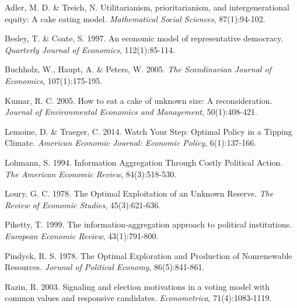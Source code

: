 \documentclass[11pt,preprint, authoryear]{elsarticle}
\numberwithin{equation}{section}
\numberwithin{figure}{section}
\numberwithin{table}{section}
\begin{document}
Adler, M. D. \& Treich, N. Utilitarianism, prioritarianism, and
intergenerational equity: A cake eating model. \emph{Mathematical Social
Sciences}, 87(1):94-102.

Besley, T. \& Coate, S. 1997. An economic model of representative
democracy. \emph{Quarterly Journal of Economics}, 112(1):85-114.

Buchholz, W., Haupt, A. \& Peters, W. 2005. \emph{The Scandinavian
Journal of Economics}, 107(1):175-195.

Kumar, R. C. 2005. How to eat a cake of unknown size: A reconsideration.
\emph{Journal of Environmental Economics and Management}, 50(1):408-421.

Lemoine, D. \& Traeger, C. 2014. Watch Your Step: Optimal Policy in a
Tipping Climate. \emph{American Economic Journal: Economic Policy},
6(1):137-166.

Lohmann, S. 1994. Information Aggregation Through Costly Political
Action. \emph{The American Economic Review}, 84(3):518-530.

Loury, G. C. 1978. The Optimal Exploitation of an Unknown Reserve.
\emph{The Review of Economic Studies}, 45(3):621-636.

Piketty, T. 1999. The information-aggregation approach to political
institutions. \emph{European Economic Review}, 43(1):791-800.

Pindyck, R. S. 1978. The Optimal Exploration and Production of
Nonrenewable Resources. \emph{Jorunal of Political Economy},
86(5):841-861.

Razin, R. 2003. Signaling and election motivations in a voting model
with common values and responsive candidates. \emph{Econometrica},
71(4):1083-1119.


\end{document}

